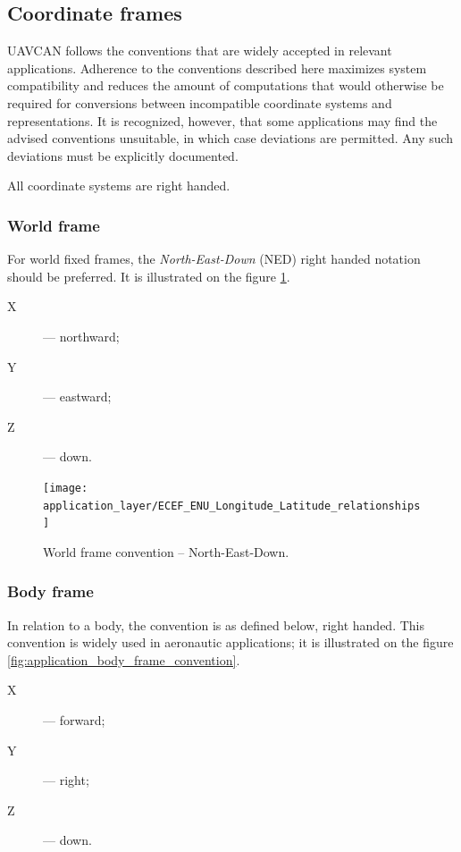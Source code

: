\subsection{Coordinate frames}

UAVCAN follows the conventions that are widely accepted in relevant applications.
Adherence to the conventions described here maximizes system compatibility and reduces the amount of
computations that would otherwise be required for conversions between incompatible coordinate systems
and representations.
It is recognized, however, that some applications may find the advised conventions unsuitable,
in which case deviations are permitted.
Any such deviations must be explicitly documented.

All coordinate systems are right handed.

\subsubsection{World frame}

For world fixed frames, the \emph{North-East-Down} (NED) right handed notation should be preferred.
It is illustrated on the figure \ref{fig:application_world_frame_convention}.
\begin{samepage}
\begin{description}
    \item[X] --- northward;
    \item[Y] --- eastward;
    \item[Z] --- down.
\end{description}
\end{samepage}

\begin{figure}[hbt]
    \centering
	\texttt{[image: application\_layer/ECEF\_ENU\_Longitude\_Latitude\_relationships]}
    \caption{
        World frame convention -- North-East-Down.
        \label{fig:application_world_frame_convention}
    }
\end{figure}

\subsubsection{Body frame}

In relation to a body, the convention is as defined below, right handed.
This convention is widely used in aeronautic applications;
it is illustrated on the figure \ref{fig:application_body_frame_convention}.
\begin{samepage}
\begin{description}
    \item[X] --- forward;
    \item[Y] --- right;
    \item[Z] --- down.
\end{description}
\end{samepage}

